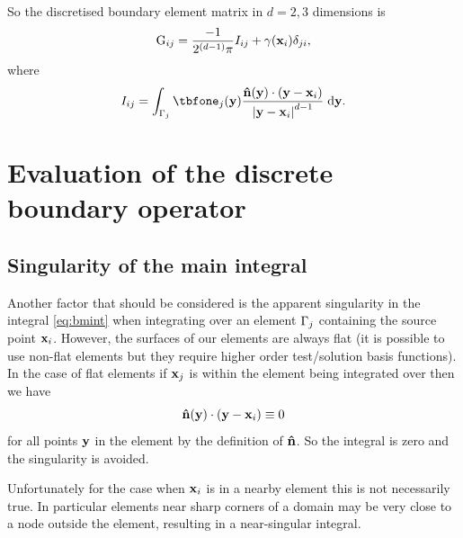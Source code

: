 \newcommand{\bminta}{I}
\newcommand{\bmint}{\bminta_{ij}}

So the discretised boundary element matrix in $d=2,3$ dimensions is
\begin{equation}
  \label{eq:19}
  \bm_{\ibasis\ibasisb} =\frac{-1}{2^{(d-1)} \pi} \bmint
    + \gamma(\xv_\ibasis)\delta_{\ibasisb\ibasis},
\end{equation}
where
\begin{equation}
  \bmint = \int_{\boundd_\ibasisb} \tbfone_{\ibasisb}(\yv) \frac{\nv(\yv) \cdot (\yv - \xv_\ibasis)}{\abs{\yv - \xv_\ibasis} ^{d-1}} \d \yv.
\label{eq:bmint}
\end{equation}

\section{Evaluation of the discrete boundary operator}
\label{sec:calc-integr-i_bm}

\subsection{Singularity of the main integral}
\label{sec:bem-singularity}

Another factor that should be considered is the apparent singularity in the integral \cref{eq:bmint} when integrating over an element ${\Gamma}_j$ containing the source point $\mathbf{x}_{i}$.
However, the surfaces of our elements are always flat (it is possible to use non-flat elements but they require higher order test/solution basis functions).
In the case of flat elements if $\mathbf{x}_{j}$ is within the element being integrated over then we have
\begin{equation}
  \label{eq:7}
  \mathbf{\hat{n}}(\mathbf{y}) \cdot (\mathbf{y} - \mathbf{x}_i) \equiv 0
\end{equation}
for all points $\mathbf{y}$ in the element by the definition of $\mathbf{\hat{n}}$.
So the integral is zero and the singularity is avoided.

Unfortunately for the case when $\mathbf{x}_i$ is in a nearby element this is not necessarily true. 
In particular elements near sharp corners of a domain may be very close to a node outside the element, resulting in a near-singular integral.



